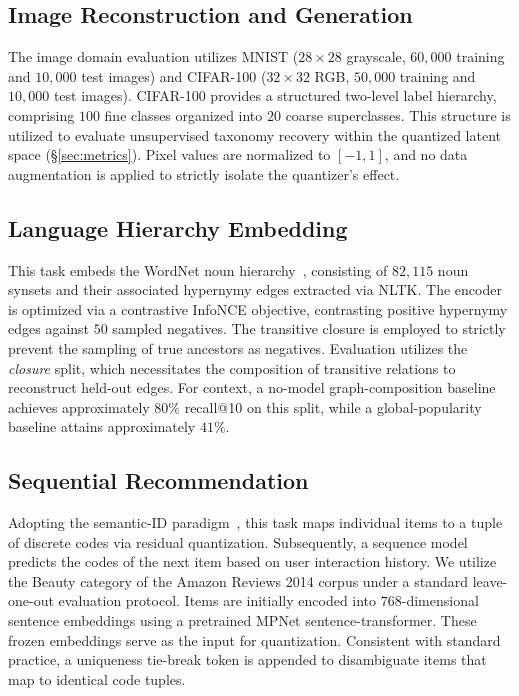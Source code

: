 \documentclass[12pt]{report}
\begin{document}
\subsection{Image Reconstruction and Generation}
\label{sec:tasks_image}
The image domain evaluation utilizes MNIST ($28\times28$ grayscale, $60{,}000$ training and $10{,}000$ test images) and CIFAR-100 ($32\times32$ RGB, $50{,}000$ training and $10{,}000$ test images). CIFAR-100 provides a structured two-level label hierarchy, comprising $100$ fine classes organized into $20$ coarse superclasses. This structure is utilized to evaluate unsupervised taxonomy recovery within the quantized latent space (\S\ref{sec:metrics}). Pixel values are normalized to $[-1,1]$, and no data augmentation is applied to strictly isolate the quantizer's effect.

\subsection{Language Hierarchy Embedding}
\label{sec:tasks_nlp}
This task embeds the WordNet noun hierarchy~\cite{nickel2017poincare}, consisting of $82{,}115$ noun synsets and their associated hypernymy edges extracted via NLTK. The encoder is optimized via a contrastive InfoNCE objective, contrasting positive hypernymy edges against $50$ sampled negatives. The transitive closure is employed to strictly prevent the sampling of true ancestors as negatives. Evaluation utilizes the \emph{closure} split, which necessitates the composition of transitive relations to reconstruct held-out edges. For context, a no-model graph-composition baseline achieves approximately $80\%$ recall@10 on this split, while a global-popularity baseline attains approximately $41\%$.

\subsection{Sequential Recommendation}
\label{sec:tasks_rec}
Adopting the semantic-ID paradigm~\cite{tiger}, this task maps individual items to a tuple of discrete codes via residual quantization. Subsequently, a sequence model predicts the codes of the next item based on user interaction history. We utilize the Beauty category of the Amazon Reviews 2014 corpus under a standard leave-one-out evaluation protocol. Items are initially encoded into $768$-dimensional sentence embeddings using a pretrained MPNet sentence-transformer. These frozen embeddings serve as the input for quantization. Consistent with standard practice, a uniqueness tie-break token is appended to disambiguate items that map to identical code tuples.
\end{document}
